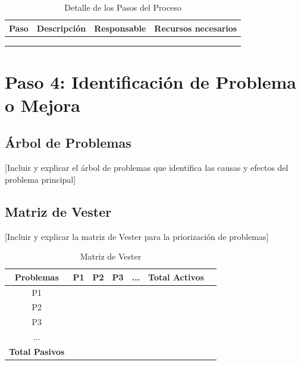 \documentclass[12pt,letterpaper]{report}
\begin{document}
\begin{table}[H]
    \centering
    \begin{tabularx}{\textwidth}{|X|X|X|X|}
        \hline
        \textbf{Paso} & \textbf{Descripción} & \textbf{Responsable} & \textbf{Recursos necesarios} \\
        \hline
        & & & \\
        \hline
        & & & \\
        \hline
        & & & \\
        \hline
    \end{tabularx}
    \caption{Detalle de los Pasos del Proceso}
\end{table}

\section{Paso 4: Identificación de Problema o Mejora}

\subsection{Árbol de Problemas}
[Incluir y explicar el árbol de problemas que identifica las causas y efectos del problema principal]

\subsection{Matriz de Vester}
[Incluir y explicar la matriz de Vester para la priorización de problemas]

\begin{table}[H]
    \centering
    \begin{tabular}{|c|c|c|c|c|c|c|}
        \hline
        \textbf{Problemas} & \textbf{P1} & \textbf{P2} & \textbf{P3} & \textbf{...} & \textbf{Total Activos} \\
        \hline
        P1 & & & & & \\
        \hline
        P2 & & & & & \\
        \hline
        P3 & & & & & \\
        \hline
        ... & & & & & \\
        \hline
        \textbf{Total Pasivos} & & & & & \\
        \hline
    \end{tabular}
    \caption{Matriz de Vester}
\end{table}
\end{document}
